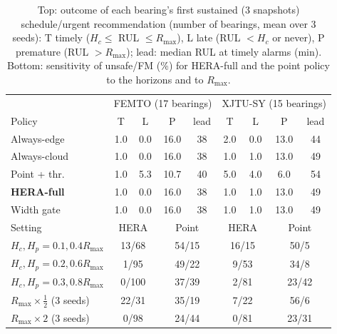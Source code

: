 \begin{table}[t]
\centering
\caption{Top: outcome of each bearing's first sustained (3 snapshots) schedule/urgent recommendation (number of bearings, mean over 3 seeds): T timely ($H_c\le$ RUL $\le R_{\max}$), L late (RUL $<H_c$ or never), P premature (RUL $>R_{\max}$); lead: median RUL at timely alarms (min). Bottom: sensitivity of unsafe/FM (\%) for HERA-full and the point policy to the horizons and to $R_{\max}$.}
\label{tab:timing}
\setlength{\tabcolsep}{2.6pt}\footnotesize
\begin{tabular}{l|cccc|cccc}
\toprule
 & \multicolumn{4}{c|}{FEMTO (17 bearings)} & \multicolumn{4}{c}{XJTU-SY (15 bearings)} \\
Policy & T & L & P & lead & T & L & P & lead \\
\midrule
Always-edge & 1.0 & 0.0 & 16.0 & 38 & 2.0 & 0.0 & 13.0 & 44 \\
Always-cloud & 1.0 & 0.0 & 16.0 & 38 & 1.0 & 1.0 & 13.0 & 49 \\
Point + thr. & 1.0 & 5.3 & 10.7 & 40 & 5.0 & 4.0 & 6.0 & 54 \\
\textbf{HERA-full} & 1.0 & 0.0 & 16.0 & 38 & 1.0 & 1.0 & 13.0 & 49 \\
Width gate & 1.0 & 0.0 & 16.0 & 38 & 1.0 & 1.0 & 13.0 & 49 \\
\midrule
Setting & \multicolumn{2}{c}{HERA} & \multicolumn{2}{c|}{Point} & \multicolumn{2}{c}{HERA} & \multicolumn{2}{c}{Point} \\
\midrule
$H_c,H_p{=}0.1,0.4R_{\max}$ & \multicolumn{2}{c}{13/68} & \multicolumn{2}{c|}{54/15} & \multicolumn{2}{c}{16/15} & \multicolumn{2}{c}{50/5} \\
$H_c,H_p{=}0.2,0.6R_{\max}$ & \multicolumn{2}{c}{1/95} & \multicolumn{2}{c|}{49/22} & \multicolumn{2}{c}{9/53} & \multicolumn{2}{c}{34/8} \\
$H_c,H_p{=}0.3,0.8R_{\max}$ & \multicolumn{2}{c}{0/100} & \multicolumn{2}{c|}{37/39} & \multicolumn{2}{c}{2/81} & \multicolumn{2}{c}{23/42} \\
$R_{\max}\times\frac12$ (3 seeds) & \multicolumn{2}{c}{22/31} & \multicolumn{2}{c|}{35/19} & \multicolumn{2}{c}{7/22} & \multicolumn{2}{c}{56/6} \\
$R_{\max}\times 2$ (3 seeds) & \multicolumn{2}{c}{0/98} & \multicolumn{2}{c|}{24/44} & \multicolumn{2}{c}{0/81} & \multicolumn{2}{c}{23/31} \\
\bottomrule
\end{tabular}
\end{table}
